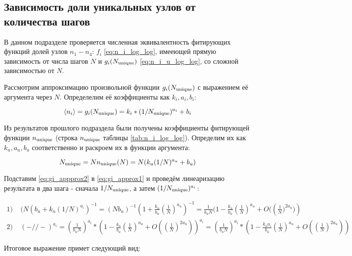 \subsection{Зависимость доли уникальных узлов от количества шагов}

В данном подразделе проверяется численная эквивалентность фитирующих функций долей узлов $n_1-n_4$: $f_i$ \eqref{eq:n_i_log_log}, имееющей прямую зависимость от числа шагов $N$ и $g_i(N_{\textup{unique}})$ \eqref{eq:n_i_u_log_log}, со сложной зависимостью от $N$.

Рассмотрим аппроксимацию произвольной функции $g_i(N_{\textup{unique}})$ с выражением её аргумента через $N$. Определелим её коэффициенты как $k_i, a_i, b_i$:

\begin{equation}
	\langle n_i \rangle = g_i(N_{\textup{unique}}) = k_i * (1/N_{\textup{unique}})^{a_i} + b_i
	\label{eq:gi_approx1}
\end{equation}

Из результатов прошлого подраздела были получены коэффициенты фитирующей функции $n_{\textup{unique}}$ (строка $n_{\textup{unique}}$ таблицы \ref{tab:n_i_log_log}). Определим их как $k_u, a_u, b_u$ соответственно и раскроем их в функции аргумента: 

\begin{equation}
	N_{\textup{unique}} = N n_{\textup{unique}}(N) = N (k_u (1/N)^{a_u} + b_u)
	\label{eq:gi_appprox2}
\end{equation}


Подставим \eqref{eq:gi_appprox2} в \eqref{eq:gi_approx1} и проведём линеаризацию результата в два шага - сначала $1/N_{\textup{unique}}$, а затем $(1/N_{\textup{unique}})^{a_i}$:

\begin{large}
\begin{equation*}
\begin{array}{l}
1)\ \ \ \ \ (N (b_u + k_u(1/N)^{a_i})^{-1} = ( N b_u)^{-1} (1 + \frac{k_u}{b_u} (\frac{1}{N})^{a_u})^{-1} = \frac{1}{b_u N} (1 - \frac{k_u}{b_u} (\frac{1}{N})^{a_u} + O(\left(\frac{1}{N})^{2a_u})\right) \\

2)\ \ \ \ \ ( - // - )^{a_i}  = (\frac{1}{b_u N})^{a_i} * (1 - \frac{k_u}{b_u} (\frac{1}{N})^{a_u} + O(\left(\frac{1}{N}\right)^{2a_u}))^{a_i} =  (\frac{1}{b_u N})^{a_i} * (1 - \frac{k_u a_i}{b_u} (\frac{1}{N})^{a_u} + O(\left(\frac{1}{N}\right)^{2a_u}))
\end{array}
\end{equation*}
\end{large}

Итоговое выражение примет следующий вид:

